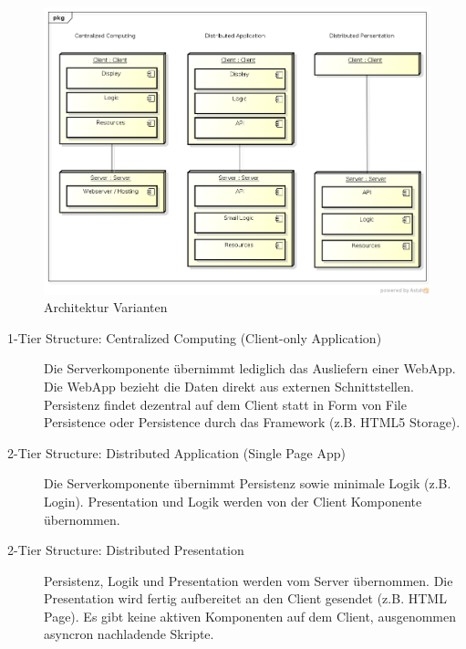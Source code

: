 		\begin{figure}[H]
			\includegraphics[width=\textwidth]{architecture/media/img/tierArchitecture.png}
			\centering
			\caption{Architektur Varianten}
			\label{fig:tierArchitecture}
		\end{figure}
		\begin{description}
			\item[1-Tier Structure: Centralized Computing (Client-only Application)]
				Die Serverkomponente übernimmt lediglich das Ausliefern einer WebApp. 
				Die WebApp bezieht die Daten direkt aus externen Schnittstellen. 
				Persistenz findet dezentral auf dem Client statt in Form von File Persistence oder 
				Persistence durch das Framework (z.B. HTML5 Storage).
				
			\item[2-Tier Structure: Distributed Application (Single Page App)]
				Die Serverkomponente übernimmt Persistenz sowie minimale Logik (z.B. Login).
				Presentation und Logik werden von der Client Komponente übernommen.
				
			\item[2-Tier Structure: Distributed Presentation]
				Persistenz, Logik und Presentation werden vom Server übernommen.
				Die Presentation wird fertig aufbereitet an den Client gesendet (z.B. HTML Page).
				Es gibt keine aktiven Komponenten auf dem Client, ausgenommen asyncron nachladende Skripte.				
		\end{description}
	
